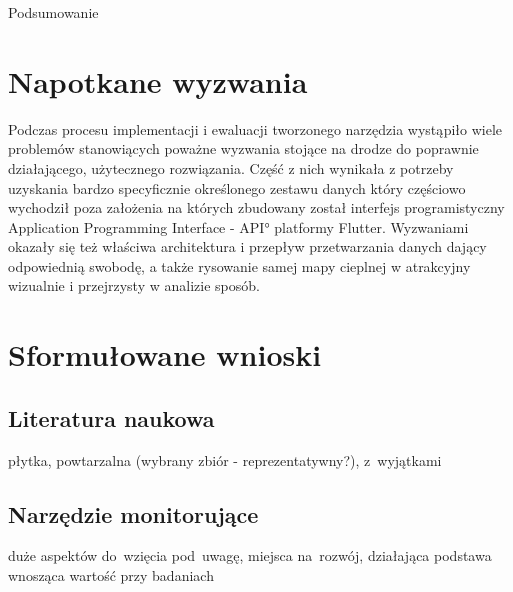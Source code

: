\begin{chapter}{Podsumowanie}
	\section{Napotkane wyzwania}
	Podczas procesu implementacji i ewaluacji tworzonego narzędzia wystąpiło wiele problemów stanowiących poważne wyzwania stojące na drodze do poprawnie działającego, użytecznego rozwiązania. Część z nich wynikała z potrzeby uzyskania bardzo specyficznie określonego zestawu danych który częściowo wychodził poza założenia na których zbudowany został interfejs programistyczny \ang{Application Programming Interface - API} platformy Flutter. Wyzwaniami okazały się też właściwa architektura i przepływ przetwarzania danych dający odpowiednią swobodę, a także rysowanie samej mapy cieplnej w atrakcyjny wizualnie i przejrzysty w analizie sposób.
	
	\section{Sformułowane wnioski}
	
	\subsection{Literatura naukowa}
	płytka, powtarzalna (wybrany zbiór - reprezentatywny?), z~wyjątkami
	
	\subsection{Narzędzie monitorujące}
	duże aspektów do~wzięcia pod~uwagę, miejsca na~rozwój, działająca podstawa wnosząca wartość przy badaniach
	
\end{chapter}
